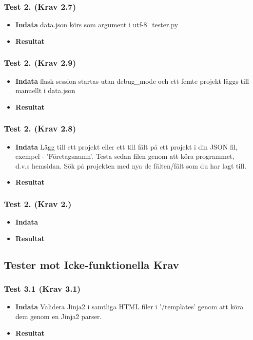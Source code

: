 \documentclass{TDP003mall}
\begin{document}
\subsubsection*{Test 2. (Krav 2.7)}
\begin{itemize}%
\item[]\textbf{Indata} data.json körs som argument i utf-8\_tester.py
\item[]\textbf{Resultat} 
\end{itemize}
\subsubsection*{Test 2. (Krav 2.9)}
\begin{itemize}
\item[]\textbf{Indata} flask session startas utan debug\_mode och ett femte projekt läggs till manuellt i data.json 
\item[]\textbf{Resultat} 
\end{itemize}
\subsubsection*{Test 2. (Krav 2.8)}
\begin{itemize}
\item[]\textbf{Indata} Lägg till ett projekt eller ett till fält på ett projekt i din JSON fil, exempel - 'Företagsnamn'. Testa sedan filen genom att köra programmet, d.v.s hemsidan. Sök på projekten med nya de fälten/fält som du har lagt till.  
\item[]\textbf{Resultat} 
\end{itemize}
\subsubsection*{Test 2. (Krav 2.)}
\begin{itemize}
\item[]\textbf{Indata}
\item[]\textbf{Resultat} 
\end{itemize}






\subsection{Tester mot Icke-funktionella Krav}
\subsubsection*{Test 3.1 (Krav 3.1)}
\begin{itemize}
\item[]\textbf{Indata} Validera Jinja2 i samtliga HTML filer i '/templates' genom att köra dem genom en Jinja2 parser.
\item[]\textbf{Resultat} 
\end{itemize}
\end{document}

